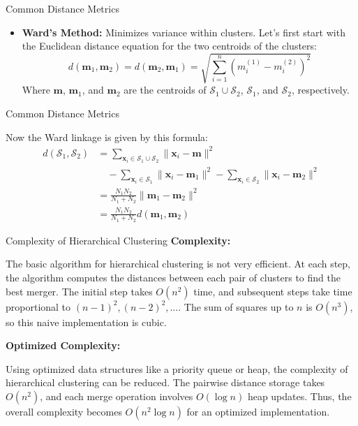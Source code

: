 \documentclass[compress]{beamer}
\begin{document}
\begin{frame}[t]{Common Distance Metrics}
\begin{itemize}
\item  \textbf{Ward's Method:} Minimizes variance within clusters. Let’s first start with the Euclidean distance equation for the two centroids of the clusters:
\begin{equation}
d(\mathbf{m}_1,\mathbf{m}_2) = d(\mathbf{m}_2,\mathbf{m}_1) = \sqrt{\sum_{i=1}^{n} (m_i^{(1)}-m_i^{(2)})^2}
\end{equation}
Where $\mathbf{m}$, $\mathbf{m}_1$, and $\mathbf{m}_2$ are the centroids of $\mathcal{S}_1 \cup \mathcal{S}_2$, $\mathcal{S}_1$, and $\mathcal{S}_2$, respectively.

\end{itemize}
\end{frame}

\begin{frame}[t]{Common Distance Metrics}

Now the Ward linkage is given by this formula:
\begin{equation} \label{ward_linkage_1}
\begin{aligned}
d(\mathcal{S}_1, \mathcal{S}_2) & = \sum_{\mathbf{x}_i \in \mathcal{S_1} \cup \mathcal{S}_2} \| \mathbf{x}_i-\mathbf{m} \|^2 \\
& \quad - \sum_{\mathbf{x}_i \in \mathcal{S}_1} \| \mathbf{x}_i - \mathbf{m}_1\|^2 - \sum_{\mathbf{x}_i \in \mathcal{S}_2} \| \mathbf{x}_i - \mathbf{m}_2\|^2 \\
& = \frac{N_1 N_2}{N_1 + N_2} \| \mathbf{m}_1 - \mathbf{m}_2 \|^2 \\
& = \frac{N_1 N_2}{N_1 + N_2} d(\mathbf{m}_1, \mathbf{m}_2)
\end{aligned}
\end{equation}

\end{frame}

\begin{frame}[t]{Complexity of Hierarchical Clustering}
\textbf{Complexity:}

The basic algorithm for hierarchical clustering is not very efficient. At each step, the algorithm computes the distances between each pair of clusters to find the best merger. The initial step takes \( O(n^2) \) time, and subsequent steps take time proportional to \( (n - 1)^2, (n - 2)^2, \dots \). The sum of squares up to \( n \) is \( O(n^3) \), so this naive implementation is cubic.

\textbf{Optimized Complexity:}

Using optimized data structures like a priority queue or heap, the complexity of hierarchical clustering can be reduced. The pairwise distance storage takes \( O(n^2) \), and each merge operation involves \( O(\log n) \) heap updates. Thus, the overall complexity becomes \( O(n^2 \log n) \) for an optimized implementation.

\end{frame}
\end{document}
